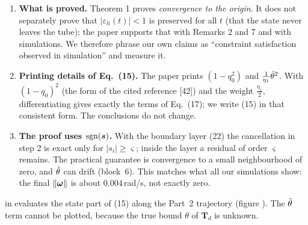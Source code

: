 \begin{warn}
\begin{enumerate}[leftmargin=*]
  \item \textbf{What is proved.} Theorem 1 proves \emph{convergence to the origin}. It does not separately prove that
        $|\varepsilon_{li}(t)|<1$ is preserved for all $t$ (that the state never leaves the tube); the paper supports that
        with Remarks 2 and 7 and with simulations. We therefore phrase our own claims as ``constraint satisfaction
        observed in simulation'' and measure it.
  \item \textbf{Printing details of Eq.~(15).} The paper prints $(1-q_0^2)$ and $\tfrac{1}{\eta_1}\tilde{\theta}^2$. With
        $(1-q_0)^2$ (the form of the cited reference [42]) and the weight $\tfrac{\eta_1}{2}$, differentiating gives exactly
        the terms of Eq.~(17); we write (15) in that consistent form. The conclusions do not change.
  \item \textbf{The proof uses $\operatorname{sgn}(\bm{s})$.} With the boundary layer (22) the cancellation in step 2 is exact only for
        $|s_i|\ge\varsigma$; inside the layer a residual of order $\varsigma$ remains. The practical guarantee is convergence to
        a small neighbourhood of zero, and $\hat{\theta}$ can drift (block~6). This matches what all our simulations show: the
        final $\|\bm{\omega}\|$ is about $0.004$\,rad/s, not exactly zero.
\end{enumerate}
\end{warn}

\begin{projbox}
 in  evaluates the state part of (15) along the Part~2 trajectory
(figure ). The $\tilde{\theta}$ term cannot be plotted, because the true bound $\theta$ of
$\bm T_d$ is unknown.
\end{projbox}

